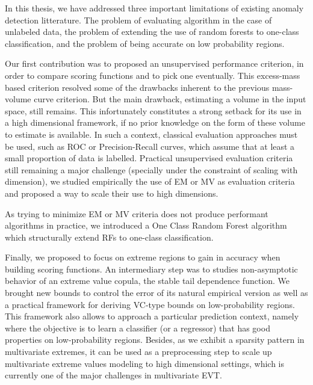 In this thesis, we have addressed three important limitations of existing anomaly detection litterature. The problem of evaluating algorithm in the case of unlabeled data, the problem of extending the use of random forests to one-class classification, and the problem of being accurate on low probability regions.

Our first contribution was to proposed an unsupervised performance criterion, in order to compare scoring functions and to pick one eventually.
%
This excess-mass based criterion resolved some of the drawbacks inherent to the previous mass-volume curve criterion. But the main drawback, estimating a volume in the input space, still remains. This infortunately constitutes a strong setback for its use in a high dimensional framework, if no prior knowledge on the form of these volume to estimate is available. In such a context, classical evaluation approaches must be used, such as ROC or Precision-Recall curves, which assume that at least a small proportion of data is labelled.
Practical unsupervised evaluation criteria still remaining a major challenge (specially under the constraint of scaling with dimension), we studied empirically the use of EM or MV as evaluation criteria and proposed a way to scale their use to high dimensions.

As trying to minimize EM or MV criteria does not produce performant algorithms in practice, we introduced a One Class Random Forest algorithm which structurally extend RFs to one-class classification.
 
Finally, we proposed to focus on extreme regions to gain in accuracy when building scoring functions. An intermediary step was %
to
studies non-asymptotic behavior of an extreme value copula, the stable tail dependence function. We brought new bounds to control the error of its natural empirical version as well as a practical framework for deriving VC-type bounds on low-probability regions.
%
This framework also allows to approach a particular prediction context, namely where the objective is to learn a classifier (or a regressor) that has good properties on low-probability regions.
%
% 
%
Besides, as we exhibit a sparsity pattern in multivariate extremes, it can be used as a preprocessing step to scale up multivariate extreme values modeling to high dimensional settings, which is currently one of the major challenges in multivariate EVT.


